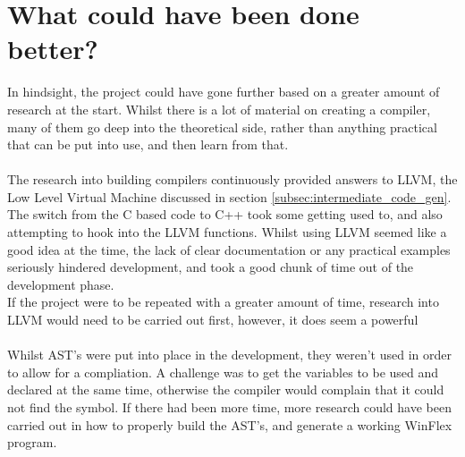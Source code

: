 \documentclass[12pt]{report}
\begin{document}
\section{What could have been done better?}\label{sec:con:better}
In hindsight, the project could have gone further based on a greater amount of research at the start.  Whilst there is a lot of material on creating a compiler, many of them go deep into the theoretical side, rather than anything practical that can be put into use, and then learn from that.\\
\\
The research into building compilers continuously provided answers to LLVM, the Low Level Virtual Machine discussed in section \ref{subsec:intermediate_code_gen}.  The switch from the C based code to C++ took some getting used to, and also attempting to hook into the LLVM functions.  Whilst using LLVM seemed like a good idea at the time, the lack of clear documentation or any practical examples seriously hindered development, and took a good chunk of time out of the development phase.\\
If the project were to be repeated with a greater amount of time, research into LLVM would need to be carried out first, however, it does seem a powerful 
\\
\\
Whilst AST's were put into place in the development, they weren't used in order to allow for a compliation.  A challenge was to get the variables to be used and declared at the same time, otherwise the compiler would complain that it could not find the symbol.  If there had been more time, more research could have been carried out in how to properly build the AST's, and generate a working WinFlex program.




\end{document}
